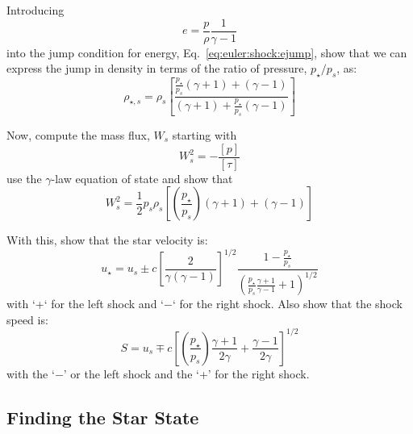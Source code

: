 \begin{exercise}
{
Introducing
\begin{equation}
e = \frac{p}{\rho} \frac{1}{\gamma -1}
\end{equation}
into the jump condition for energy, Eq.~\ref{eq:euler:shock:ejump},
show that we can express the jump in density in terms of the
ratio of pressure, $p_\star/p_s$, as:
\begin{equation}
\label{eq:euler:shockrhojump}
\rho_{\star,s} = \rho_s \left [ \frac{ \frac{p_\star}{p_s} (\gamma + 1) + (\gamma - 1)}
   {(\gamma + 1) + \frac{p_\star}{p_s} (\gamma -1)} \right ]
\end{equation}
}

Now, compute the mass flux, $W_s$ starting with
\begin{equation}
W_s^2 = -\frac{[p]}{[\tau]}
\end{equation}
use the $\gamma$-law equation of state and show that
\begin{equation}
W_s^2 = \frac{1}{2} p_s \rho_s \left [ \left(\frac{p_\star}{p_s}\right) (\gamma + 1) + (\gamma -1) \right ]
\end{equation}

With this, show that the star velocity is:
\begin{equation}
\label{eq:euler:shockujump}
u_\star = u_s \pm c \left [\frac{2}{\gamma(\gamma - 1)}\right]^{1/2} \frac{1 - \frac{p_\star}{p_s}}{\left ( \frac{p_\star}{p_s} \frac{\gamma + 1}{\gamma - 1} + 1\right)^{1/2}}
\end{equation}
with `+` for the left shock and `$-$` for the right shock.
Also show that the shock speed is:
\begin{equation}
\label{eq:euler:shockspeedjump}
S = u_s \mp c \left [ \left ( \frac{p_\star}{p_s} \right ) \frac{\gamma+1}{2\gamma} + \frac{\gamma-1}{2\gamma} \right ]^{1/2}
\end{equation}
with the `$-$' or the left shock and the `+' for the right shock.
\end{exercise}

\subsection{Finding the Star State}

\label{Euler:riemann:starstate}

